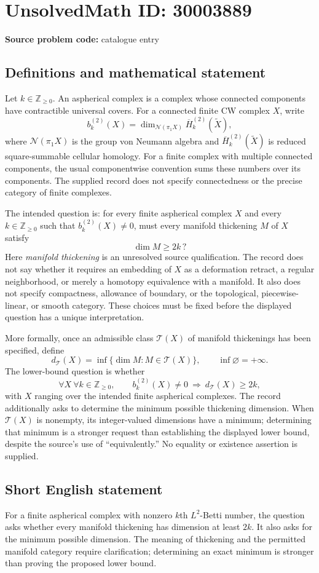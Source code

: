 \documentclass[11pt]{article}
\newcommand{\Z}{\mathbb{Z}}
\begin{document}
\section*{UnsolvedMath ID: 30003889}
\textbf{Source problem code:} catalogue entry
\subsection{Definitions and mathematical statement}
Let \(k\in\Z_{\geq 0}\). An aspherical complex is a complex whose connected components have contractible universal covers. For a connected finite CW complex \(X\), write
\[
b_k^{(2)}(X)=\dim_{\mathcal N(\pi_1X)}\overline H_k^{(2)}(\widetilde X),
\]
where \(\mathcal N(\pi_1X)\) is the group von Neumann algebra and \(\overline H_k^{(2)}(\widetilde X)\) is reduced square-summable cellular homology. For a finite complex with multiple connected components, the usual componentwise convention sums these numbers over its components. The supplied record does not specify connectedness or the precise category of finite complexes.

The intended question is: for every finite aspherical complex \(X\) and every \(k\in\Z_{\geq0}\) such that \(b_k^{(2)}(X)\ne0\), must every manifold thickening \(M\) of \(X\) satisfy
\[
\dim M\geq 2k\,?
\]
Here \emph{manifold thickening} is an unresolved source qualification. The record does not say whether it requires an embedding of \(X\) as a deformation retract, a regular neighborhood, or merely a homotopy equivalence with a manifold. It also does not specify compactness, allowance of boundary, or the topological, piecewise-linear, or smooth category. These choices must be fixed before the displayed question has a unique interpretation.

More formally, once an admissible class \(\mathcal T(X)\) of manifold thickenings has been specified, define
\[
d_{\mathcal T}(X)=\inf\{\dim M:M\in\mathcal T(X)\},
\qquad \inf\varnothing=+\infty.
\]
The lower-bound question is whether
\[
\forall X\ \forall k\in\Z_{\geq0},\qquad
b_k^{(2)}(X)\ne0\ \Longrightarrow\ d_{\mathcal T}(X)\geq2k,
\]
with \(X\) ranging over the intended finite aspherical complexes. The record additionally asks to determine the minimum possible thickening dimension. When \(\mathcal T(X)\) is nonempty, its integer-valued dimensions have a minimum; determining that minimum is a stronger request than establishing the displayed lower bound, despite the source's use of ``equivalently.'' No equality or existence assertion is supplied.
\subsection{Short English statement}
For a finite aspherical complex with nonzero \(k\)th \(L^2\)-Betti number, the question asks whether every manifold thickening has dimension at least \(2k\). It also asks for the minimum possible dimension. The meaning of thickening and the permitted manifold category require clarification; determining an exact minimum is stronger than proving the proposed lower bound.
\end{document}
